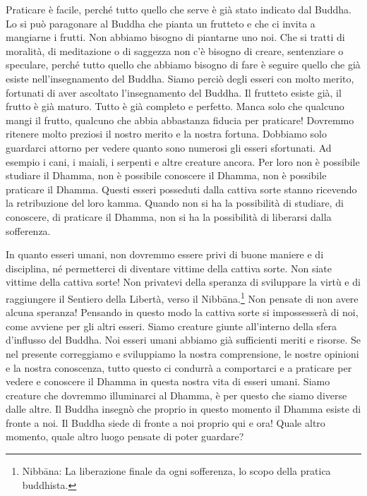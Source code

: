 Praticare è facile, perché tutto quello che serve è già stato indicato
dal Buddha. Lo si può paragonare al Buddha che pianta un frutteto e che
ci invita a mangiarne i frutti. Non abbiamo bisogno di piantarne uno
noi. Che si tratti di moralità, di meditazione o di saggezza non c'è
bisogno di creare, sentenziare o speculare, perché tutto quello che
abbiamo bisogno di fare è seguire quello che già esiste
nell'insegnamento del Buddha. Siamo perciò degli esseri con molto
merito, fortunati di aver ascoltato l'insegnamento del Buddha. Il
frutteto esiste già, il frutto è già maturo. Tutto è già completo e
perfetto. Manca solo che qualcuno mangi il frutto, qualcuno che abbia
abbastanza fiducia per praticare! Dovremmo ritenere molto preziosi il
nostro merito e la nostra fortuna. Dobbiamo solo guardarci attorno per
vedere quanto sono numerosi gli esseri sfortunati. Ad esempio i cani, i
maiali, i serpenti e altre creature ancora. Per loro non è possibile
studiare il Dhamma, non è possibile conoscere il Dhamma, non è possibile
praticare il Dhamma. Questi esseri posseduti dalla cattiva sorte stanno
ricevendo la retribuzione del loro kamma. Quando non si ha la
possibilità di studiare, di conoscere, di praticare il Dhamma, non si ha
la possibilità di liberarsi dalla sofferenza.

In quanto esseri umani, non dovremmo essere privi di buone maniere e di
disciplina, né permetterci di diventare vittime della cattiva sorte. Non
siate vittime della cattiva sorte! Non privatevi della speranza di
sviluppare la virtù e di raggiungere il Sentiero della Libertà, verso il
Nibbāna.\footnote{Nibbāna: La liberazione finale da ogni
  sofferenza, lo scopo della pratica buddhista.} Non pensate di non
avere alcuna speranza! Pensando in questo modo la cattiva sorte si
impossesserà di noi, come avviene per gli altri esseri. Siamo creature
giunte all'interno della sfera d'influsso del Buddha. Noi esseri umani
abbiamo già sufficienti meriti e risorse. Se nel presente correggiamo e
sviluppiamo la nostra comprensione, le nostre opinioni e la nostra
conoscenza, tutto questo ci condurrà a comportarci e a praticare per
vedere e conoscere il Dhamma in questa nostra vita di esseri umani.
Siamo creature che dovremmo illuminarci al Dhamma, è per questo che
siamo diverse dalle altre. Il Buddha insegnò che proprio in questo
momento il Dhamma esiste di fronte a noi. Il Buddha siede di fronte a
noi proprio qui e ora! Quale altro momento, quale altro luogo pensate di
poter guardare?

